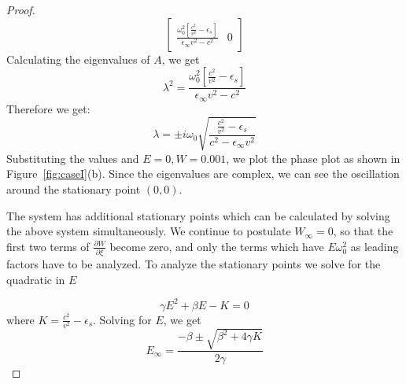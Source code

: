 \documentclass{article}[12pt]
\theoremstyle{plain}
\begin{document}
\begin{proof}
\[\begin{bmatrix}
                    \frac{\omega_0^2[\frac{c^2}{v^2} - \epsilon_s]}
                    {\epsilon_\infty v^2-c^2} & 0 
\end{bmatrix}
\]
Calculating the eigenvalues of $A$, we get 
\[
\lambda^2 =\frac{\omega_0^2[\frac{c^2}{v^2} - \epsilon_s]}
                    {\epsilon_\infty v^2 - c^2} 
\]
Therefore we get:
\begin{equation}
\lambda = \pm i \omega_0 \sqrt{ \frac{ \frac{c^2}{v^2} -\epsilon_s }
{c^2-\epsilon_\infty v^2}} \label{eqn:caseI}
\end{equation}
Substituting the values and $E=0,W=0.001$, we plot the phase plot as shown
in Figure~\ref{fig:caseI}(b). Since the eigenvalues are complex, we can see the
oscillation around the stationary point $(0,0)$.

The system has additional stationary points which can be calculated by solving
the above system simultaneously. We continue to postulate $W_\infty=0$, so
that the first two terms of $\frac{\partial W}{\partial \xi}$ become
zero, and only the terms which have $E\omega_0^2$
as leading factors have to be analyzed.
To analyze the stationary points we
solve for the quadratic in $E$

\begin{equation}
\gamma E^2 + \beta E - K = 0
\end{equation}
where $K=\frac{c^2}{v^2}-\epsilon_s$.
Solving for $E$, we get
\[
E_\infty = \frac{ -\beta \pm \sqrt{\beta^2 + 4\gamma K}}{2\gamma}
\]


\end{proof}
\end{document}
